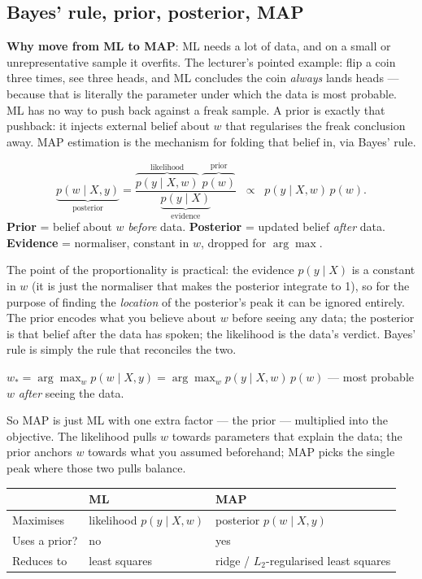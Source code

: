 \documentclass[11pt, a4paper]{article}
\newcommand{\thead}[1]{\textbf{#1}}
\newcommand{\kw}[1]{\textbf{#1}}
\begin{document}
\subsection{Bayes' rule, prior, posterior, MAP}

\kw{Why move from ML to MAP}: ML needs a lot of data, and on a small or unrepresentative sample it
overfits. The lecturer's pointed example: flip a coin three times, see three heads, and ML concludes
the coin \emph{always} lands heads — because that is literally the parameter under which the data is
most probable. ML has no way to push back against a freak sample. A prior is exactly that pushback:
it injects external belief about $w$ that regularises the freak conclusion away. MAP estimation is
the mechanism for folding that belief in, via Bayes' rule.

\begin{defbox}
\[
\underbrace{p(w\mid X,y)}_{\text{posterior}}=
\frac{\overbrace{p(y\mid X,w)}^{\text{likelihood}}\;\overbrace{p(w)}^{\text{prior}}}
{\underbrace{p(y\mid X)}_{\text{evidence}}}
\;\;\propto\;\; p(y\mid X,w)\,p(w).
\]
\kw{Prior} = belief about $w$ \emph{before} data. \kw{Posterior} = updated belief \emph{after} data.
\kw{Evidence} = normaliser, constant in $w$, dropped for $\arg\max$.
\end{defbox}

The point of the proportionality is practical: the evidence $p(y\mid X)$ is a constant in $w$ (it is
just the normaliser that makes the posterior integrate to 1), so for the purpose of finding the
\emph{location} of the posterior's peak it can be ignored entirely. The prior encodes what you
believe about $w$ before seeing any data; the posterior is that belief after the data has spoken;
the likelihood is the data's verdict. Bayes' rule is simply the rule that reconciles the two.

\begin{defbox}
$w_\ast=\arg\max_w p(w\mid X,y)=\arg\max_w p(y\mid X,w)\,p(w)$ — most probable $w$ \emph{after}
seeing the data.
\end{defbox}

So MAP is just ML with one extra factor — the prior — multiplied into the objective. The likelihood
pulls $w$ towards parameters that explain the data; the prior anchors $w$ towards what you assumed
beforehand; MAP picks the single peak where those two pulls balance.

\begin{center}
\renewcommand{\arraystretch}{1.2}
\begin{tabularx}{\linewidth}{l X X}
\toprule
& \thead{ML} & \thead{MAP} \\
\midrule
Maximises & likelihood $p(y\mid X,w)$ & posterior $p(w\mid X,y)$ \\
Uses a prior? & no & yes \\
Reduces to & least squares & ridge / $L_2$-regularised least squares \\
\bottomrule
\end{tabularx}
\end{center}
\end{document}
